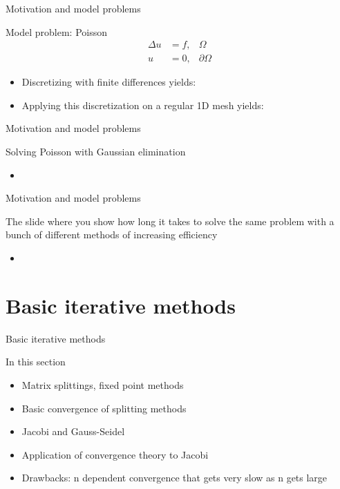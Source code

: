 \documentclass[18pt,xcolor=table]{beamer}
\begin{document}
\begin{frame}{Motivation and model problems}
\begin{block}{Model problem: Poisson}
\begin{align*}
\Delta u &= f, & \Omega \\
u &= 0, & \partial \Omega
\end{align*}
\begin{itemize}
\item Discretizing with finite differences yields:
\end{itemize}
\begin{itemize}
\item Applying this discretization on a regular 1D mesh yields:
\end{itemize}
\end{block}

\end{frame}

\begin{frame}{Motivation and model problems}
\begin{block}{Solving Poisson with Gaussian elimination}
\begin{itemize}
\item 
\end{itemize}
\end{block}

\end{frame}

\begin{frame}{Motivation and model problems}
\begin{block}{The slide where you show how long it takes to solve the same problem with a bunch of different methods of increasing efficiency}
\begin{itemize}
\item 
\end{itemize}
\end{block}

\end{frame}


\section{Basic iterative methods}

\begin{frame}{Basic iterative methods}
\begin{block}{In this section}
\begin{itemize}
\item Matrix splittings, fixed point methods
\item Basic convergence of splitting methods
\item Jacobi and Gauss-Seidel
\item Application of convergence theory to Jacobi
\item Drawbacks: n dependent convergence that gets very slow as n gets large
\end{itemize}
\end{block}

\end{frame}
\end{document}
